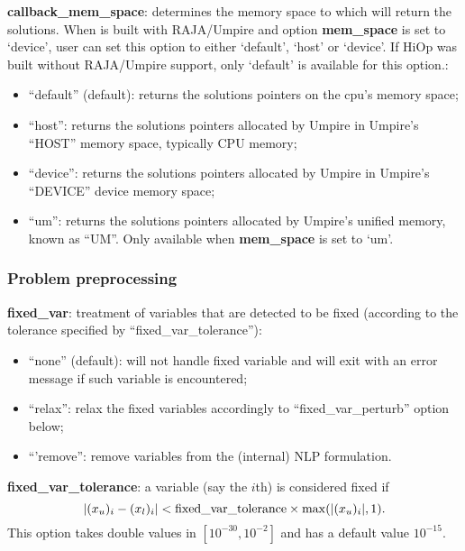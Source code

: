 \noindent \textbf{callback\_mem\_space}: determines the memory space to which \Hi will return the solutions. When \Hi is built with RAJA/Umpire and option \textbf{mem\_space} is set to `device', user can set this option to either `default', `host' or `device'. If HiOp was built without RAJA/Umpire support, only `default' is available for this option.:
\begin{itemize}
\item ``default'' (default): returns the solutions pointers on the cpu's memory space;
\item ``host'':  returns the solutions pointers allocated by Umpire in Umpire's ``HOST'' memory space, typically CPU memory;
\item ``device'': returns the solutions pointers allocated by Umpire in Umpire's ``DEVICE'' device memory space; 
\item ``um'': returns the solutions pointers allocated by Umpire's unified memory, known as ``UM''. Only available when \textbf{mem\_space} is set to `um'.
\end{itemize}
\medskip



\subsubsection{Problem preprocessing}

\noindent \textbf{fixed\_var}: treatment of variables that are detected to be fixed (according to the tolerance specified by ``fixed\_var\_tolerance''):
\begin{itemize}
\item ``none'' (default): will not handle fixed variable and will exit with an error message if such variable is encountered;
\item ``relax'':  relax the fixed variables accordingly to ``fixed\_var\_perturb'' option below;
\item ``'remove'': remove variables from the (internal) NLP formulation.
\end{itemize}
\medskip

\noindent \textbf{fixed\_var\_tolerance}: a variable (say the $i$th) is considered fixed if 
\begin{displaymath}
|(x_u)_i-(x_l)_i| < \textnormal{fixed\_var\_tolerance} \times \max(|(x_u)_i|,1).
\end{displaymath}
This option takes double values in $[10^{-30}, 10^{-2}]$ and has a default value $10^{-15}$.
\medskip


